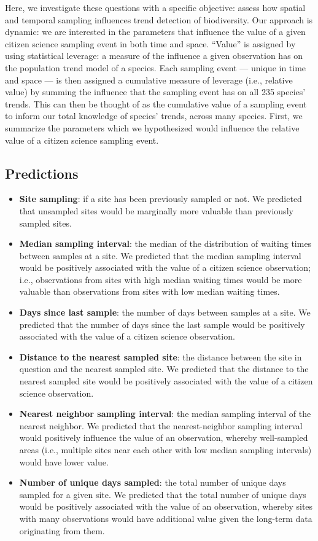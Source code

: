 \documentclass[9pt,twocolumn,twoside,lineno]{pnas-new}
\begin{document}
Here, we investigate these questions with a specific objective: assess how spatial and temporal sampling influences trend detection of biodiversity. Our approach is dynamic: we are interested in the parameters that influence the value of a given citizen science sampling event in both time and space. ``Value'' is assigned by using statistical leverage: a measure of the influence a given observation has on the population trend model of a species. Each sampling event --- unique in time and space --- is then assigned a cumulative measure of leverage (i.e., relative value) by summing the influence that the sampling event has on all 235 species' trends. This can then be thought of as the cumulative value of a sampling event to inform our total knowledge of species' trends, across many species. First, we summarize the parameters which we hypothesized would influence the relative value of a citizen science sampling event.

\subsection*{Predictions}

\begin{itemize}
  \item \textbf{Site sampling}: if a site has been previously sampled or not. We predicted that unsampled sites would be marginally more valuable than previously sampled sites.
  \item \textbf{Median sampling interval}: the median of the distribution of waiting times between samples at a site. We predicted that the median sampling interval would be positively associated with the value of a citizen science observation; i.e., observations from sites with high median waiting times would be more valuable than observations from sites with low median waiting times.
  \item \textbf{Days since last sample}: the number of days between samples at a site. We predicted that the number of days since the last sample would be positively associated with the value of a citizen science observation.
  \item \textbf{Distance to the nearest sampled site}: the distance between the site in question and the nearest sampled site. We predicted that the distance to the nearest sampled site would be positively associated with the value of a citizen science observation.
  \item \textbf{Nearest neighbor sampling interval}: the median sampling interval of the nearest neighbor. We predicted that the nearest-neighbor sampling interval would positively influence the value of an observation, whereby well-sampled areas (i.e., multiple sites near each other with low median sampling intervals) would have lower value.
  \item \textbf{Number of unique days sampled}: the total number of unique days sampled for a given site. We predicted that the total number of unique days would be positively associated with the value of an observation, whereby sites with many observations would have additional value given the long-term data originating from them.
\end{itemize}
\end{document}
